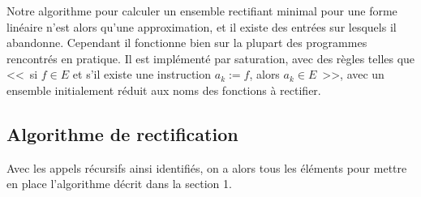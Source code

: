 Notre algorithme pour calculer un ensemble rectifiant minimal pour une forme
linéaire n'est alors qu'une approximation, et il existe des entrées sur lesquels
il abandonne. Cependant il fonctionne bien sur la plupart des programmes
rencontrés en pratique. Il est implémenté par saturation, avec des règles telles
que <<~si $f \in E$ et s'il existe une instruction
$a_k := f$, alors $a_k \in E$~>>, avec un ensemble initialement réduit aux noms
des fonctions à rectifier.

\subsection{Algorithme de rectification}

Avec les appels récursifs ainsi identifiés, on a alors tous les éléments pour
mettre en place l'algorithme décrit dans la section 1.

